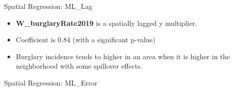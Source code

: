 \documentclass[10pt, aspectratio=169]{beamer}
\begin{document}
\begin{frame}{Spatial Regression: ML\_Lag}
    \small\begin{table}[!h]
        
        \caption{\label{tab:ml_lag_summary} Estimation results of ML\_Lag regression.}
    \end{table}
    \begin{itemize}
         
        \item \textbf{W\_burglaryRate2019} is a spatially lagged y multiplier. 
        \item \textbf{} Coefficient is 0.84 (with a significant p-value)
        \item \textbf{} Burglary incidence tends to higher in an area when it is higher in the neighborhood with some spillover effects.  
        
    \end{itemize}
\end{frame}

\begin{frame}{Spatial Regression: ML\_Error}
    \small\begin{table}[!h]
        
        \caption{\label{tab:ml_error_summary} Estimation results of ML\_Error regression.}
    \end{table}
\end{frame}



%         

\end{document}
